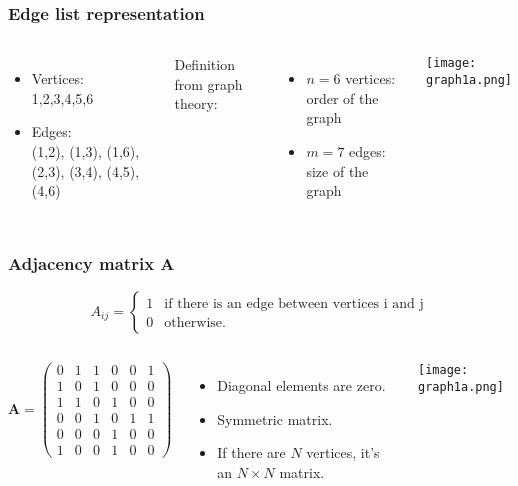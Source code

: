 \documentclass[10pt,aspectratio=169,dvipsnames]{beamer}
\let\olditem\item
\renewcommand{\item}{%
\olditem\vspace{5pt}}
\begin{document}
\begin{frame}
\frametitle{Edge list representation}
  \begin{columns}
\begin{itemize}
\item Vertices:\\
1,2,3,4,5,6\\
\item Edges:\\
(1,2), (1,3), (1,6), (2,3), (3,4), (4,5), (4,6)
\end{itemize}
Definition from graph theory:
\begin{itemize}
\item $n=6$ vertices: \alert{order} of the graph\\
\item $m=7$ edges: \alert{size} of the graph
\end{itemize}
\texttt{[image: graph1a.png]}
  \end{columns}
\end{frame}
\begin{frame}
\frametitle{Adjacency matrix $\mathbf{A}$}
\begin{equation*}
A_{ij} = \begin{cases} 1 &\mbox{if there is an edge between vertices i and j} \\
0 & \mbox{otherwise}. \end{cases}
\end{equation*}
\begin{columns}
\begin{equation*}
\mathbf{A}=\left(\begin{matrix}
0 & 1 & 1 & 0 & 0 & 1\\
1 & 0 & 1 & 0 & 0 & 0\\
1 & 1 & 0 & 1 & 0 & 0\\
0 & 0 & 1 & 0 & 1 & 1\\
0 & 0 & 0 & 1 & 0 & 0\\
1 & 0 & 0 & 1 & 0 & 0
\end{matrix}\right)
\end{equation*}
\begin{itemize}
\item Diagonal elements are zero.
\item Symmetric matrix.
\item If there are $N$ vertices, it's an $N\times N$ matrix.
\end{itemize}
\texttt{[image: graph1a.png]}
  \end{columns}
\end{frame}
\end{document}
